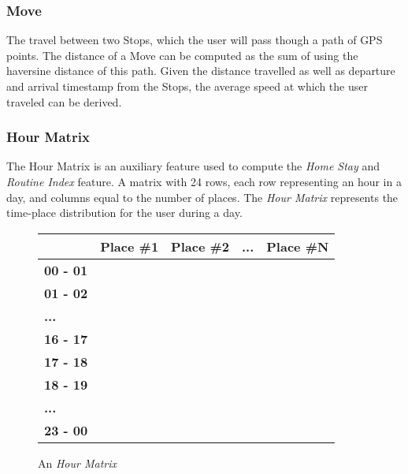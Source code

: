 \subsubsection*{Move}
The travel between two Stops, which the user will pass though a path of GPS points. The distance of a Move can be computed as the sum of using the haversine distance of this path. Given the distance travelled as well as departure and arrival timestamp from the Stops, the average speed at which the user traveled can be derived. 

\subsubsection*{Hour Matrix}
The Hour Matrix is an auxiliary feature used to compute the \textit{Home Stay} and \textit{Routine Index} feature. A matrix with 24 rows, each row representing an hour in a day, and columns equal to the number of places. The \textit{Hour Matrix} represents the time-place distribution for the user during a day.
\begin{figure}
    \centering
    \begin{tabular}{|l|l|l|l|l|}
    \hline
    \textbf{}        & \textbf{Place \#1} & \textbf{Place \#2} & \textbf{...} & \textbf{Place \#N} \\ \hline
    \textbf{00 - 01} &                    &                    &              &                    \\ \hline
    \textbf{01 - 02} &                    &                    &              &                    \\ \hline
    \textbf{...}     &                    &                    &              &                    \\ \hline
    \textbf{16 - 17} &                    &                    &              &                    \\ \hline
    \textbf{17 - 18} &                    &                    &              &                    \\ \hline
    \textbf{18 - 19} &                    &                    &              &                    \\ \hline
    \textbf{...}     &                    &                    &              &                    \\ \hline
    \textbf{23 - 00} &                    &                    &              &                    \\ \hline
    \end{tabular}
    \caption{An \textit{Hour Matrix}}
    \label{fig:time-table}
\end{figure}

